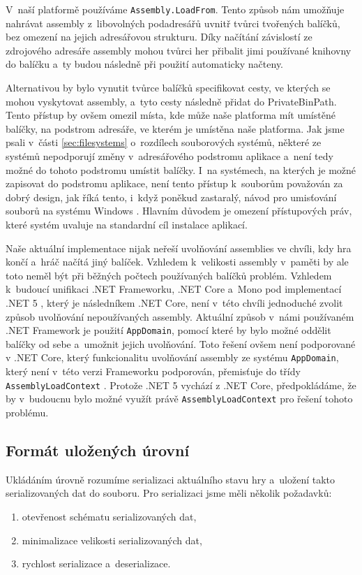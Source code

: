 V~naší platformě používáme \texttt{Assembly.LoadFrom}. Tento způsob nám umožňuje nahrávat assembly z~libovolných podadresářů uvnitř tvůrci tvořených balíčků, bez omezení na jejich adresářovou strukturu. Díky načítání závislostí ze zdrojového adresáře assembly mohou tvůrci her přibalit jimi používané knihovny do balíčku a~ty budou následně při použití automaticky načteny.

Alternativou by bylo vynutit tvůrce balíčků specifikovat cesty, ve kterých se mohou vyskytovat assembly, a~tyto cesty následně přidat do PrivateBinPath. Tento přístup by ovšem omezil místa, kde může naše platforma mít umístěné balíčky, na podstrom adresáře, ve kterém je umístěna naše platforma. Jak jsme psali v~části \ref{sec:filesystems} o~rozdílech souborových systémů, některé ze systémů nepodporují změny v~adresářového podstromu aplikace a~není tedy možné do tohoto podstromu umístit balíčky. I~na systémech, na kterých je možné zapisovat do podstromu aplikace, není tento přístup k~souborům považován za dobrý design, jak říká tento, i~když poněkud zastaralý, návod pro umisťování souborů na systému Windows \citep{site:windowsappfiles}. Hlavním důvodem je omezení přístupových práv, které systém uvaluje na standardní cíl instalace aplikací.

Naše aktuální implementace nijak neřeší uvolňování assemblies ve chvíli, kdy hra končí a~hráč načítá jiný balíček. Vzhledem k~velikosti assembly v~paměti by ale toto neměl být při běžných počtech používaných balíčků problém. Vzhledem k~budoucí unifikaci .NET Frameworku, .NET Core a~Mono pod implementací .NET 5 \citep{site:dotnet5}, který je následníkem .NET Core, není v~této chvíli jednoduché zvolit způsob uvolňování nepoužívaných assembly. Aktuální způsob v~námi používaném .NET Framework je použití \texttt{AppDomain}, pomocí které by bylo možné oddělit balíčky od sebe a~umožnit jejich uvolňování. Toto řešení ovšem není podporované v .NET Core, který funkcionalitu uvolňování assembly ze systému \texttt{AppDomain}, který není v~této verzi Frameworku podporován, přemisťuje do třídy \texttt{AssemblyLoadContext} \citep{site:assloadcontext}. Protože .NET 5 vychází z .NET Core, předpokládáme, že by v~budoucnu bylo možné využít právě \texttt{AssemblyLoadContext} pro řešení tohoto problému. 

\subsection{Formát uložených úrovní}
\label{sec:savingformat}
Ukládáním úrovně rozumíme serializaci aktuálního stavu hry a~uložení takto serializovaných dat do souboru. Pro serializaci jsme měli několik požadavků: 
\begin{enumerate}
	\item otevřenost schématu serializovaných dat,
	\item minimalizace velikosti serializovaných dat,
	\item rychlost serializace a~deserializace.
\end{enumerate}

